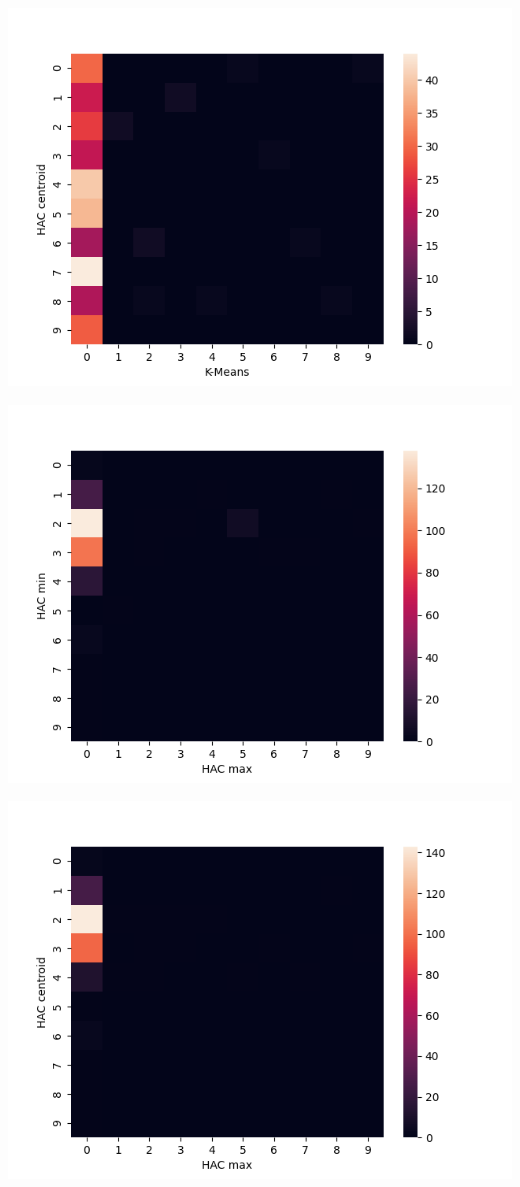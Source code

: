 \documentclass[submit]{harvardml}
\begin{document}
\begin{center}
    \includegraphics[scale=0.5]{HW4/2.6.3.png}
\end{center}
\begin{center}
    \includegraphics[scale=0.5]{HW4/2.6.4.png}
\end{center}
\begin{center}
    \includegraphics[scale=0.5]{HW4/2.6.5.png}
\end{center}
\end{document}
